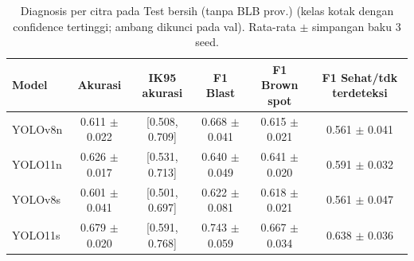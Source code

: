 \begin{table}[!t]
\centering
\caption{Diagnosis per citra pada Test bersih (tanpa BLB prov.) (kelas kotak dengan confidence tertinggi; ambang dikunci pada val). Rata-rata $\pm$ simpangan baku 3 seed.}
\label{tab:diagnosis_test_bersih}
\footnotesize
\begin{tabular}{lccccc}
\hline
\textbf{Model} & \textbf{Akurasi} & \textbf{IK95 akurasi} & \textbf{F1 Blast} & \textbf{F1 Brown spot} & \textbf{F1 Sehat/tdk terdeteksi} \\
\hline
YOLOv8n & 0.611 $\pm$ 0.022 & [0.508, 0.709] & 0.668 $\pm$ 0.041 & 0.615 $\pm$ 0.021 & 0.561 $\pm$ 0.041 \\
YOLO11n & 0.626 $\pm$ 0.017 & [0.531, 0.713] & 0.640 $\pm$ 0.049 & 0.641 $\pm$ 0.020 & 0.591 $\pm$ 0.032 \\
YOLOv8s & 0.601 $\pm$ 0.041 & [0.501, 0.697] & 0.622 $\pm$ 0.081 & 0.618 $\pm$ 0.021 & 0.561 $\pm$ 0.047 \\
YOLO11s & 0.679 $\pm$ 0.020 & [0.591, 0.768] & 0.743 $\pm$ 0.059 & 0.667 $\pm$ 0.034 & 0.638 $\pm$ 0.036 \\
\hline
\end{tabular}
\end{table}
